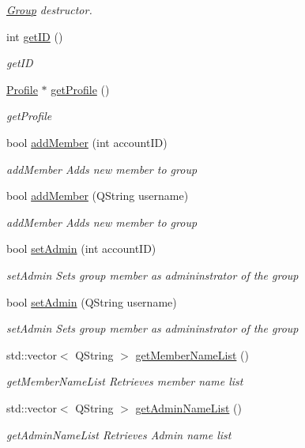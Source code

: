 \begin{DoxyCompactItemize}
\begin{DoxyCompactList}\small\item\em \hyperlink{classGroup}{Group} destructor. \end{DoxyCompactList}\item 
int \hyperlink{classGroup_a114ada54c464a97c19f578d0ab53aad5}{get\+ID} ()
\begin{DoxyCompactList}\small\item\em get\+ID \end{DoxyCompactList}\item 
\hyperlink{classProfile}{Profile} $\ast$ \hyperlink{classGroup_ad9591a9525b2851c1a5d3c45a4484c17}{get\+Profile} ()
\begin{DoxyCompactList}\small\item\em get\+Profile \end{DoxyCompactList}\item 
bool \hyperlink{classGroup_a01dcf7c9498b7f289ed2b6da6ffac76e}{add\+Member} (int account\+ID)
\begin{DoxyCompactList}\small\item\em add\+Member Adds new member to group \end{DoxyCompactList}\item 
bool \hyperlink{classGroup_a54d7e1e704f86e1900fee1ccd734d4b2}{add\+Member} (Q\+String username)
\begin{DoxyCompactList}\small\item\em add\+Member Adds new member to group \end{DoxyCompactList}\item 
bool \hyperlink{classGroup_a1f8ef25c0d64f81cd1bb9b7934efb509}{set\+Admin} (int account\+ID)
\begin{DoxyCompactList}\small\item\em set\+Admin Sets group member as admininstrator of the group \end{DoxyCompactList}\item 
bool \hyperlink{classGroup_a606b6ccdd03fc97295abc29b7b7cab45}{set\+Admin} (Q\+String username)
\begin{DoxyCompactList}\small\item\em set\+Admin Sets group member as admininstrator of the group \end{DoxyCompactList}\item 
std\+::vector$<$ Q\+String $>$ \hyperlink{classGroup_a106e3f7789d7e90ee7c9febd20f89ffc}{get\+Member\+Name\+List} ()
\begin{DoxyCompactList}\small\item\em get\+Member\+Name\+List Retrieves member name list \end{DoxyCompactList}\item 
std\+::vector$<$ Q\+String $>$ \hyperlink{classGroup_a6d0d1a01d0b2e557f65583b0798861d2}{get\+Admin\+Name\+List} ()
\begin{DoxyCompactList}\small\item\em get\+Admin\+Name\+List Retrieves Admin name list \end{DoxyCompactList}\end{DoxyCompactItemize}


